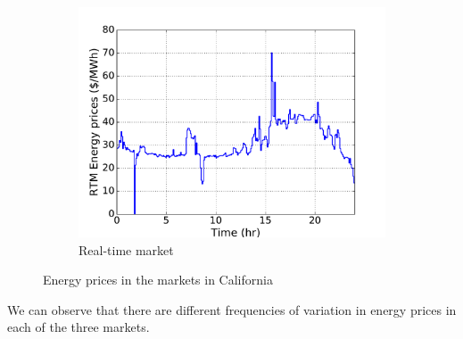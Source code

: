\documentclass[11pt,twoside]{article}
\begin{document}
\begin{figure}[h!tp]
\begin{subfigure}[b]{0.32\textwidth} \includegraphics[width=\textwidth]{Figures/rtmprices.pdf} \caption{Real-time market}\label{rtmprices}\end{subfigure} \hfill
\caption{Energy prices in the markets in California}\label{eprices}
\end{figure}
We can observe that there are different frequencies of variation in energy prices in each of the three markets.
\end{document}
